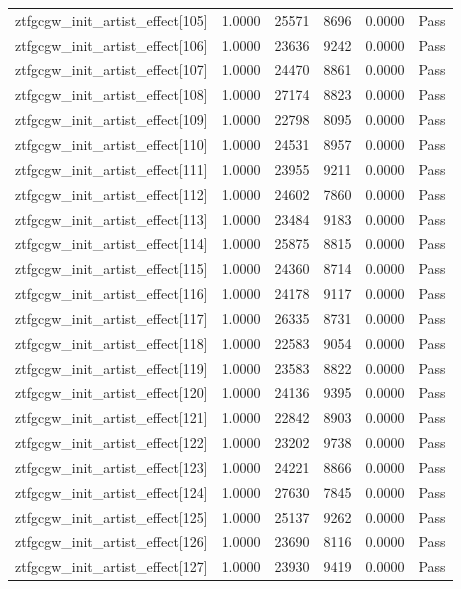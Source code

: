 \begin{table}[htbp]
\begin{tabular}{llrrll}
ztfgcgw\_init\_artist\_effect[105] & 1.0000 & 25571 & 8696 & 0.0000 & Pass \\
ztfgcgw\_init\_artist\_effect[106] & 1.0000 & 23636 & 9242 & 0.0000 & Pass \\
ztfgcgw\_init\_artist\_effect[107] & 1.0000 & 24470 & 8861 & 0.0000 & Pass \\
ztfgcgw\_init\_artist\_effect[108] & 1.0000 & 27174 & 8823 & 0.0000 & Pass \\
ztfgcgw\_init\_artist\_effect[109] & 1.0000 & 22798 & 8095 & 0.0000 & Pass \\
ztfgcgw\_init\_artist\_effect[110] & 1.0000 & 24531 & 8957 & 0.0000 & Pass \\
ztfgcgw\_init\_artist\_effect[111] & 1.0000 & 23955 & 9211 & 0.0000 & Pass \\
ztfgcgw\_init\_artist\_effect[112] & 1.0000 & 24602 & 7860 & 0.0000 & Pass \\
ztfgcgw\_init\_artist\_effect[113] & 1.0000 & 23484 & 9183 & 0.0000 & Pass \\
ztfgcgw\_init\_artist\_effect[114] & 1.0000 & 25875 & 8815 & 0.0000 & Pass \\
ztfgcgw\_init\_artist\_effect[115] & 1.0000 & 24360 & 8714 & 0.0000 & Pass \\
ztfgcgw\_init\_artist\_effect[116] & 1.0000 & 24178 & 9117 & 0.0000 & Pass \\
ztfgcgw\_init\_artist\_effect[117] & 1.0000 & 26335 & 8731 & 0.0000 & Pass \\
ztfgcgw\_init\_artist\_effect[118] & 1.0000 & 22583 & 9054 & 0.0000 & Pass \\
ztfgcgw\_init\_artist\_effect[119] & 1.0000 & 23583 & 8822 & 0.0000 & Pass \\
ztfgcgw\_init\_artist\_effect[120] & 1.0000 & 24136 & 9395 & 0.0000 & Pass \\
ztfgcgw\_init\_artist\_effect[121] & 1.0000 & 22842 & 8903 & 0.0000 & Pass \\
ztfgcgw\_init\_artist\_effect[122] & 1.0000 & 23202 & 9738 & 0.0000 & Pass \\
ztfgcgw\_init\_artist\_effect[123] & 1.0000 & 24221 & 8866 & 0.0000 & Pass \\
ztfgcgw\_init\_artist\_effect[124] & 1.0000 & 27630 & 7845 & 0.0000 & Pass \\
ztfgcgw\_init\_artist\_effect[125] & 1.0000 & 25137 & 9262 & 0.0000 & Pass \\
ztfgcgw\_init\_artist\_effect[126] & 1.0000 & 23690 & 8116 & 0.0000 & Pass \\
ztfgcgw\_init\_artist\_effect[127] & 1.0000 & 23930 & 9419 & 0.0000 & Pass \\

\end{tabular}
\end{table}
